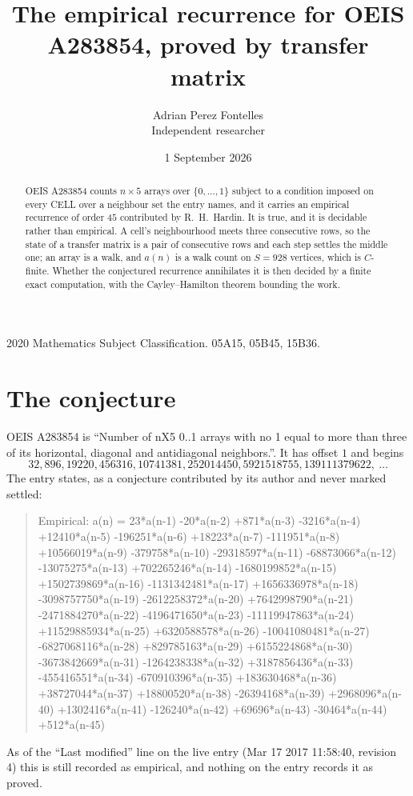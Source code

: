 \documentclass[11pt,a4paper]{article}
\title{The empirical recurrence for OEIS A283854, proved by transfer matrix}
\author{Adrian Perez Fontelles\\ \small Independent researcher}
\date{1 September 2026}
\theoremstyle{plain}
\theoremstyle{definition}
\begin{document}
\maketitle

\begin{abstract}
OEIS A283854 counts $n\times5$ arrays over $\{0,\dots,1\}$ subject to a condition imposed on
every CELL over a neighbour set the entry names, and it carries an empirical recurrence of
order $45$ contributed by R.~H.~Hardin. It is true, and it is decidable rather than
empirical. A cell's neighbourhood meets three consecutive rows, so the state of a transfer
matrix is a pair of consecutive rows and each step settles the middle one; an array is a
walk, and $a(n)$ is a walk count on $S=928$ vertices, which is $C$-finite. Whether the
conjectured recurrence annihilates it is then decided by a finite exact computation, with the
Cayley--Hamilton theorem bounding the work.
\end{abstract}

\noindent\small 2020 Mathematics Subject Classification. 05A15, 05B45, 15B36.\normalsize

\section{The conjecture}

OEIS A283854 is ``Number of nX5 0..1 arrays with no 1 equal to more than three of its horizontal, diagonal and antidiagonal neighbors.''. It has offset $1$ and begins
\[
32, 896, 19220, 456316, 10741381, 252014450, 5921518755, 139111379622,\ \dots
\]
The entry states, as a conjecture contributed by its author and never marked settled:
\begin{quote}
Empirical: a(n) = 23*a(n-1) -20*a(n-2) +871*a(n-3) -3216*a(n-4) +12410*a(n-5) -196251*a(n-6) +18223*a(n-7) -111951*a(n-8) +10566019*a(n-9) -379758*a(n-10) -29318597*a(n-11) -68873066*a(n-12) -13075275*a(n-13) +702265246*a(n-14) -1680199852*a(n-15) +1502739869*a(n-16) -1131342481*a(n-17) +1656336978*a(n-18) -3098757750*a(n-19) -2612258372*a(n-20) +7642998790*a(n-21) -2471884270*a(n-22) -4196471650*a(n-23) -11119947863*a(n-24) +11529885934*a(n-25) +6320588578*a(n-26) -10041080481*a(n-27) -6827068116*a(n-28) +829785163*a(n-29) +6155224868*a(n-30) -3673842669*a(n-31) -1264238338*a(n-32) +3187856436*a(n-33) -455416551*a(n-34) -670910396*a(n-35) +183630468*a(n-36) +38727044*a(n-37) +18800520*a(n-38) -26394168*a(n-39) +2968096*a(n-40) +1302416*a(n-41) -126240*a(n-42) +69696*a(n-43) -30464*a(n-44) +512*a(n-45)
\end{quote}
As of the ``Last modified'' line on the live entry (Mar 17 2017 11:58:40, revision 4) this is still
recorded as empirical, and nothing on the entry records it as proved.
\end{document}
